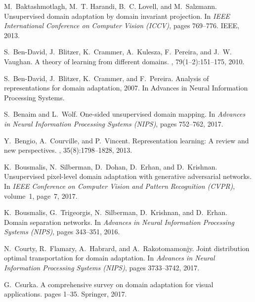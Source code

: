 \documentclass[10pt,letterpaper]{article}
\begin{document}
\begin{thebibliography}{10}\itemsep=-1pt

M.~Baktashmotlagh, M.~T. Harandi, B.~C. Lovell, and M.~Salzmann.
\newblock Unsupervised domain adaptation by domain invariant projection.
\newblock In {\em IEEE International Conference on Computer Vision (ICCV)},
  pages 769--776. IEEE, 2013.

S.~Ben-David, J.~Blitzer, K.~Crammer, A.~Kulesza, F.~Pereira, and J.~W.
  Vaughan.
\newblock A theory of learning from different domains.
, 79(1--2):151--175, 2010.

S.~Ben-David, J.~Blitzer, K.~Crammer, and F.~Pereira.
\newblock Analysis of representations for domain adaptation, 2007.
\newblock In Advances in Neural Information Processing Systems.

S.~Benaim and L.~Wolf.
\newblock One-sided unsupervised domain mapping.
\newblock In {\em Advances in Neural Information Processing Systems (NIPS)},
  pages 752--762, 2017.

Y.~Bengio, A.~Courville, and P.~Vincent.
\newblock Representation learning: A review and new perspectives.
,
  35(8):1798--1828, 2013.

K.~Bousmalis, N.~Silberman, D.~Dohan, D.~Erhan, and D.~Krishnan.
\newblock Unsupervised pixel-level domain adaptation with generative
  adversarial networks.
\newblock In {\em IEEE Conference on Computer Vision and Pattern Recognition
  (CVPR)}, volume~1, page~7, 2017.

K.~Bousmalis, G.~Trigeorgis, N.~Silberman, D.~Krishnan, and D.~Erhan.
\newblock Domain separation networks.
\newblock In {\em Advances in Neural Information Processing Systems (NIPS)},
  pages 343--351, 2016.

N.~Courty, R.~Flamary, A.~Habrard, and A.~Rakotomamonjy.
\newblock Joint distribution optimal transportation for domain adaptation.
\newblock In {\em Advances in Neural Information Processing Systems (NIPS)},
  pages 3733--3742, 2017.

G.~Csurka.
\newblock A comprehensive survey on domain adaptation for visual applications.
\newblock pages 1--35. Springer, 2017.


\end{thebibliography}
\end{document}
